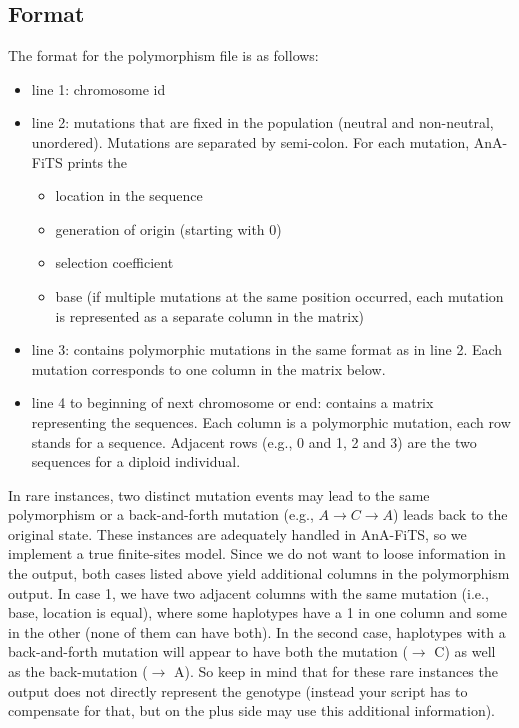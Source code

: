 \documentclass{scrartcl}
\begin{document}
\subsection{Format}

The format for the polymorphism file is as follows: 
\begin{itemize}
\item line 1: chromosome id 
\item line 2: mutations that are fixed in the population (neutral and non-neutral, unordered).
  Mutations are separated by semi-colon. For each mutation, AnA-FiTS
  prints the 
  \begin{itemize}
  \item location in the sequence
  \item generation of origin (starting  with 0)
  \item selection coefficient 
  \item base (if multiple mutations at the same position occurred,
    each mutation is represented as a separate column in the matrix)
  \end{itemize}
\item line 3: contains polymorphic mutations in the same format as in
  line 2. Each mutation corresponds to one column in the matrix
  below. 
\item line 4 to beginning of next chromosome or end: contains a matrix
  representing the sequences. Each column is a polymorphic mutation,
  each row stands for a sequence. Adjacent rows (e.g., 0 and 1, 2 and
  3) are the two sequences for a diploid individual. 
\end{itemize}

In rare instances, two distinct mutation events may lead to the same
polymorphism or a back-and-forth mutation (e.g., $A \rightarrow C
\rightarrow A$) leads back to the original state. These instances are
adequately handled in AnA-FiTS, so we implement a true finite-sites
model. Since we do not want to loose information in the output, both
cases listed above yield additional columns in the polymorphism
output. In case 1, we have two adjacent columns with the same mutation
(i.e., base, location is equal), where some haplotypes have a 1 in one
column and some in the other (none of them can have both). In the
second case, haplotypes with a back-and-forth mutation will appear to
have both the mutation ($\rightarrow$ C) as well as the back-mutation
($\rightarrow$ A). So keep in mind that for these rare instances the
output does not directly represent the genotype (instead your script
has to compensate for that, but on the plus side may use this
additional information).
\end{document}
